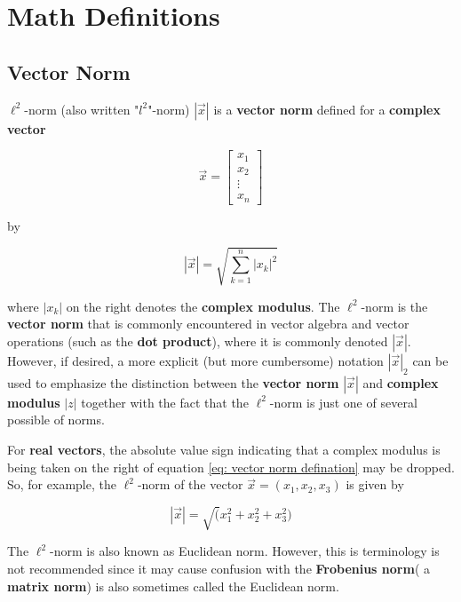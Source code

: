 
\chapter{Math Definitions}
\section{Vector Norm}
$ \ell^2 $-norm (also written "$ l^2 $"-norm) $ |\vec{x}| $ is a \textbf{vector norm} defined for a \textbf{complex vector}

\begin{equation}
\vec{x} = \begin{bmatrix}
x_1 \\ 
x_2 \\ 
\vdots \\ 
x_n
\end{bmatrix} 
\end{equation}

by

\begin{equation}
\label{eq: vector norm defination}
|\vec{x}| = \sqrt{\sum_{k=1}^{n}|x_k|^2}
\end{equation}

where $ |x_k| $ on the right denotes the \textbf{complex modulus}. The $ \ell^2 $-norm is the \textbf{vector norm} that is commonly encountered in vector algebra and vector operations (such as the \textbf{dot product}), where it is commonly denoted $ |\vec{x}| $. However, if desired, a more explicit (but more cumbersome) notation $ |\vec{x}|_2 $ can be used to emphasize the distinction between the \textbf{vector norm} $ |\vec{x}| $ and \textbf{complex modulus} $ |z| $ together with the fact that the $ \ell^2 $-norm is just one of several possible of norms.

For \textbf{real vectors}, the absolute value sign indicating that a complex modulus is being taken on the right of equation \ref{eq: vector norm defination} may be dropped. So, for example, the $ \ell^2 $-norm of the vector $ \vec{x} = (x_1, x_2, x_3) $ is given by

\begin{equation}
|\vec{x}| = \sqrt(x_1^2+x_2^2+x_3^2)
\end{equation}

The $ \ell^2 $-norm is also known as Euclidean norm. However, this is terminology is not recommended since it may cause confusion with the \textbf{Frobenius norm}( a \textbf{matrix norm}) is also sometimes called the Euclidean norm.

